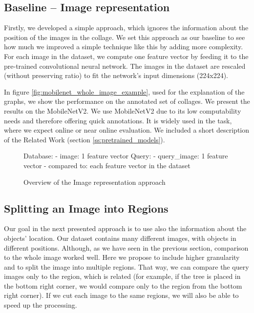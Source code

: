 \subsection{Baseline -- Image representation}

Firstly, we developed a simple approach, which ignores the information about the position of the images in the collage. We set this approach as our baseline to see how much we improved a simple technique like this by adding more complexity. For each image in the dataset, we compute one feature vector by feeding it to the pre-trained convolutional neural network. The images in the dataset are rescaled (without preserving ratio) to fit the network's input dimensions (224x224).

In figure \ref{fig:mobilenet_whole_image_example}, used for the explanation of the graphs, we show the performance on the annotated set of collages. We present the results on the MobileNetV2. We use MobileNetV2 due to its low computability needs and therefore offering quick annotations. It is widely used in the task, where we expect online or near online evaluation. We included a short description of the Related Work (section \ref{ss:pretrained_models}).

\begin{figure}
\centering
\begin{boxedverbatim}
Database:
    - image: 1 feature vector
Query:
    - query_image: 1 feature vector
    - compared to: each feature vector in the dataset
\end{boxedverbatim}
\caption{Overview of the Image representation approach}
\end{figure}

\subsection{Splitting an Image into Regions}

Our goal in the next presented approach is to use also the information about the objects' location. Our dataset contains many different images, with objects in different positions. Although, as we have seen in the previous section, comparison to the whole image worked well. Here we propose to include higher granularity and to split the image into multiple regions. That way, we can compare the query images only to the region, which is related (for example, if the tree is placed in the bottom right corner, we would compare only to the region from the bottom right corner). If we cut each image to the same regions, we will also be able to speed up the processing.

